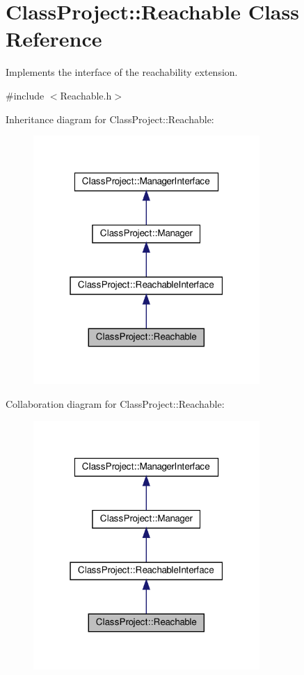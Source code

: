 \hypertarget{classClassProject_1_1Reachable}{}\section{Class\+Project\+:\+:Reachable Class Reference}
\label{classClassProject_1_1Reachable}


Implements the interface of the reachability extension.  




{\ttfamily \#include $<$Reachable.\+h$>$}



Inheritance diagram for Class\+Project\+:\+:Reachable\+:
\nopagebreak
\begin{figure}[H]
\begin{center}
\leavevmode
\includegraphics[width=244pt]{classClassProject_1_1Reachable__inherit__graph}
\end{center}
\end{figure}


Collaboration diagram for Class\+Project\+:\+:Reachable\+:
\nopagebreak
\begin{figure}[H]
\begin{center}
\leavevmode
\includegraphics[width=244pt]{classClassProject_1_1Reachable__coll__graph}
\end{center}
\end{figure}
